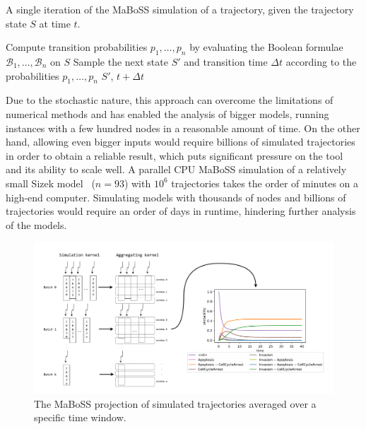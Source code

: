 \begin{algorithm}
    \caption{A single iteration of the MaBoSS simulation of a trajectory, given the trajectory state $S$ at time $t$.}
    \label{alg:iter}
    \begin{algorithmic}[1]
    \State Compute transition probabilities $p_1, \dots, p_n$ by evaluating the Boolean formulae $\mathcal{B}_1, \dots, \mathcal{B}_n$ on $S$
    \State Sample the next state $S'$ and transition time $\Delta t$ according to the probabilities $p_1, \dots, p_n$
    \State \Return $S'$, $t + \Delta t$ 
    \EndProcedure
    \end{algorithmic}
\end{algorithm}

Due to the stochastic nature, this approach can overcome the limitations of numerical methods and has enabled the analysis of bigger models, running instances with a few hundred nodes in a reasonable amount of time. On the other hand, allowing even bigger inputs would require billions of simulated trajectories in order to obtain a reliable result, which puts significant pressure on the tool and its ability to scale well. A parallel CPU MaBoSS simulation of a relatively small Sizek model~\cite{sizek2019boolean} ($n=93$) with $10^6$ trajectories takes the order of minutes on a high-end computer. Simulating models with thousands of nodes and billions of trajectories would require an order of days in runtime, hindering further analysis of the models.

\begin{figure}
    \centering
    \includegraphics[width=\textwidth]{img/mabossg-kernels.drawio.pdf}
    \caption{The MaBoSS projection of simulated trajectories averaged over a specific time window.}
    \label{fig:maboss}
\end{figure}

